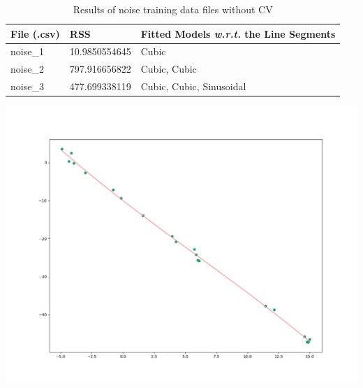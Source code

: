 \documentclass[a4paper,11pt]{article}
\begin{document}
\begin{table}[ht!]
    \begin{minipage}{0.5\linewidth}
    \scriptsize
    \centering
    \caption{Results of noise training data files without CV}
    \label{tab:noise_no_cv_results}
    \begin{tabular}{l l l}
        \toprule
        File (.csv) & RSS & Fitted Models \textit{w.r.t.} the Line Segments \\
        \midrule
        noise\_1
            & \num{10.9850554645}
            & Cubic
        \\
        noise\_2
            & \num{797.916656822}
            & Cubic, Cubic
        \\
        noise\_3
            & \num{477.699338119}
            & Cubic, Cubic, Sinusoidal
        \\
        \bottomrule
    \end{tabular}
    \end{minipage}
    \begin{minipage}{0.5\linewidth}
    \centering
    \includegraphics[width=1\linewidth]{res/noise_1_no_cv.png}
    \label{fig:noise_1_no_cv}
    \end{minipage}
\end{table}

\FloatBarrier
\end{document}
